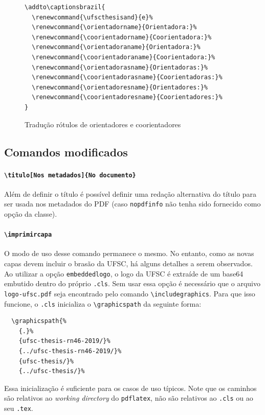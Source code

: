 \documentclass[embeddedlogo]{ufsc-thesis-rn46-2019}
\newcommand{\lacmd}[1]{\texttt{\textbackslash{}#1}}
\begin{document}
\begin{figure}[tb]
  \centering
\begin{verbatim}
\addto\captionsbrazil{
  \renewcommand{\ufscthesisand}{e}%
  \renewcommand{\orientadorname}{Orientadora:}%
  \renewcommand{\coorientadorname}{Coorientadora:}%
  \renewcommand{\orientadoraname}{Orientadora:}%
  \renewcommand{\coorientadoraname}{Coorientadora:}%
  \renewcommand{\orientadorasname}{Orientadoras:}%
  \renewcommand{\coorientadorasname}{Coorientadoras:}%
  \renewcommand{\orientadoresname}{Orientadores:}%
  \renewcommand{\coorientadoresname}{Coorientadores:}%
}
\end{verbatim}
  \caption{Tradução rótulos de orientadores e coorientadores}
  \label{fig:rotulos}
\end{figure}

\subsection{Comandos \abnTeX{} modificados}

\paragraph*{\lacmd{titulo[Nos metadados]\{No documento\}}} Além de definir o título é
possível definir uma redação alternativa do título para ser usada nos metadados
do PDF (caso \texttt{nopdfinfo} não tenha sido fornecido como opção da classe).

\paragraph*{\lacmd{imprimircapa}} O modo de uso desse comando permanece o
mesmo. No entanto, como as novas capas devem incluir o brasão da UFSC, há alguns
detalhes a serem observados. Ao utilizar a opção \texttt{embeddedlogo}, o logo
da UFSC é extraíde de um base64 embutido dentro do próprio \texttt{.cls}. Sem
usar essa opção é necessário que o arquivo \texttt{logo-ufsc.pdf} seja
encontrado pelo comando \lacmd{includegraphics}. Para que isso funcione, o
\texttt{.cls} inicializa o \lacmd{graphicspath} da seguinte forma:

\begin{verbatim}
  \graphicspath{%
    {.}%
    {ufsc-thesis-rn46-2019/}%
    {../ufsc-thesis-rn46-2019/}%
    {ufsc-thesis/}%
    {../ufsc-thesis/}%
\end{verbatim}

Essa inicialização é suficiente para os casos de uso típicos. Note que os
caminhos são relativos ao \emph{working directory} do \texttt{pdflatex}, não são
relativos ao \texttt{.cls} ou ao seu \texttt{.tex}.
\end{document}
